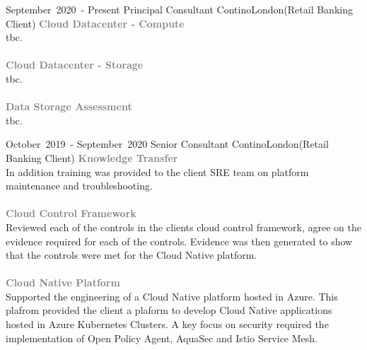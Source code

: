 
\edef\hc{\string:}

\cventry %
  {\mbox{September 2020 -} \mbox{Present}}
  {Principal Consultant}
  {Contino}{London}{(Retail Banking Client)}
  { 
    \textcolor{gray}{\textbf{Cloud Datacenter - Compute}}\\ 
    tbc.\\\\ 
    \textcolor{gray}{\textbf{Cloud Datacenter - Storage}}\\ 
    tbc.\\\\ 
    \textcolor{gray}{\textbf{Data Storage Assessment}}\\ 
    tbc.\\
  }

\cventry %
  {\mbox{October 2019 -} \mbox{September 2020}}
  {Senior Consultant}
  {Contino}{London}{(Retail Banking Client)}
  {
    \textcolor{gray}{\textbf{Knowledge Transfer}}\\
    In addition training was provided
    to the client SRE team on platform maintenance and troubleshooting.\\\\
    \textcolor{gray}{\textbf{Cloud Control Framework}}\\
    Reviewed each of the controls in the clients cloud control framework, 
    agree on the evidence required for each of the controls. 
    Evidence was then generated to show that the controls were met for the 
    Cloud Native platform.\\\\
    \textcolor{gray}{\textbf{Cloud Native Platform}}\\
    Supported the engineering of a Cloud Native platform hosted in Azure. 
    This plafrom provided the client a plaform to develop Cloud Native applications
    hosted in Azure Kubernetes Clusters. A key focus on security required the implementation
    of Open Policy Agent, AquaSec and Istio Service Mesh.\\
  }

